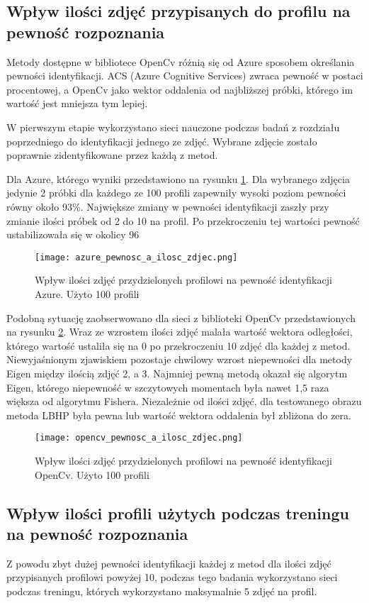 \subsection{Wpływ ilości zdjęć przypisanych do profilu na pewność rozpoznania}
Metody dostępne w bibliotece OpenCv różnią się od Azure sposobem określania pewności identyfikacji. ACS (Azure Cognitive Services) zwraca pewność w postaci procentowej, a OpenCv jako wektor oddalenia od najbliższej próbki, którego im wartość jest mniejsza tym lepiej.

W pierwszym etapie wykorzystano sieci nauczone podczas badań z rozdziału poprzedniego do identyfikacji jednego ze zdjęć. Wybrane zdjęcie zostało poprawnie zidentyfikowane przez każdą z metod.

Dla Azure, którego wyniki przedstawiono na rysunku \ref{fig:azure_zdjecia}. Dla wybranego zdjęcia jedynie 2 próbki dla każdego ze 100 profili zapewniły wysoki poziom pewności równy około 93\%. Największe zmiany w pewności identyfikacji zaszły przy zmianie ilości próbek od 2 do 10 na profil. Po przekroczeniu tej wartości pewność ustabilizowała się w okolicy 96%
\begin{figure}[H]
	\centering
	\texttt{[image: azure\_pewnosc\_a\_ilosc\_zdjec.png]}
	\caption{Wpływ ilości zdjęć przydzielonych profilowi na pewność identyfikacji Azure. Użyto 100 profili}
	\label{fig:azure_zdjecia}
\end{figure}
Podobną sytuację zaobserwowano dla sieci z biblioteki OpenCv przedstawionych na rysunku \ref{fig:opencv_zdjecia}. Wraz ze wzrostem ilości zdjęć malała wartość wektora odległości, którego wartość ustaliła się na 0 po przekroczeniu 10 zdjęć dla każdej z metod. Niewyjaśnionym zjawiskiem pozostaje chwilowy wzrost niepewności dla metody Eigen między ilością zdjęć 2, a 3. Najmniej pewną metodą okazał się algorytm Eigen, którego niepewność w szczytowych momentach była nawet 1,5 raza większa od algorytmu Fishera. Niezależnie od ilości zdjęć, dla testowanego obrazu metoda LBHP była pewna lub wartość wektora oddalenia był zbliżona do zera.
\begin{figure}[H]
	\centering
	\texttt{[image: opencv\_pewnosc\_a\_ilosc\_zdjec.png]}
	\caption{Wpływ ilości zdjęć przydzielonych profilowi na pewność identyfikacji OpenCv. Użyto 100 profili}
	\label{fig:opencv_zdjecia}
\end{figure}

\subsection{Wpływ ilości profili użytych podczas treningu na pewność rozpoznania}
Z powodu zbyt dużej pewności identyfikacji każdej z metod dla ilości zdjęć przypisanych profilowi powyżej 10, podczas tego badania wykorzystano sieci podczas treningu, których wykorzystano maksymalnie 5 zdjęć na profil. 

